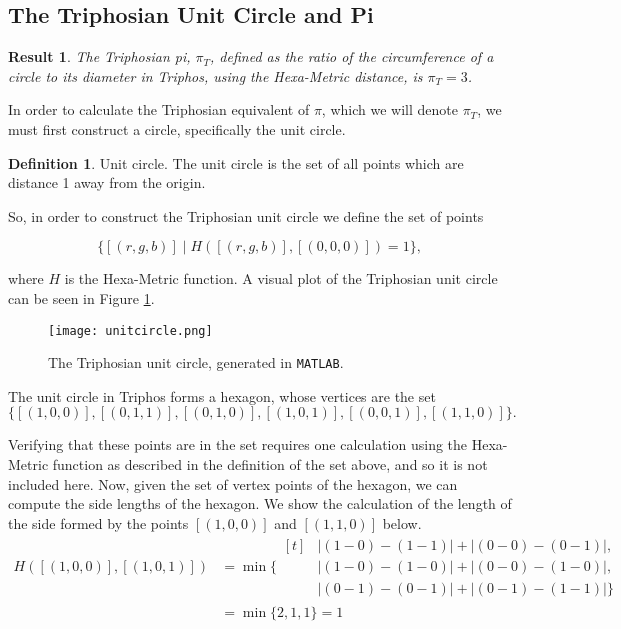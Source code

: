 \documentclass[11pt]{article}
\theoremstyle{definition}
\newtheorem{definition}{Definition}
\theoremstyle{plain}
\newtheorem{result}{Result}
\theoremstyle{remark}
\begin{document}
	\subsection{The Triphosian Unit Circle and Pi}

	\begin{result}
		The Triphosian pi, \(\pi_T\), defined as the ratio of the circumference
		of a circle to its diameter in Triphos, using the Hexa-Metric distance,
		is \(\pi_T = 3\).
	\end{result}

	In order to calculate the Triphosian equivalent of \(\pi\), which we will
	denote \(\pi_T\), we must first construct a circle, specifically the unit
	circle.

	\begin{definition}{Unit circle.}
		The unit circle is the set of all points which are distance 1 away from
		the origin.
	\end{definition}

	So, in order to construct the Triphosian unit circle we define the set of
	points

	\[\{[(r,g,b)] \mid H([(r,g,b)], [(0,0,0)]) = 1\},\]

	where \(H\) is the Hexa-Metric function. A visual plot of the Triphosian
	unit circle can be seen in Figure \ref{fig:uc}.

	\begin{figure}[htbp]
		\centering
		\texttt{[image: unitcircle.png]}
		\caption{The Triphosian unit circle, generated in \texttt{MATLAB}.}
		\label{fig:uc}
	\end{figure}

	The unit circle in Triphos forms a hexagon, whose vertices are the set
	\[ \{[(1,0,0)], [(0,1,1)], [(0,1,0)], [(1,0,1)], [(0,0,1)], [(1,1,0)]\}. \]

	Verifying that these points are in the set requires one calculation using
	the Hexa-Metric function as described in the definition of the set above,
	and so it is not included here. Now, given the set of vertex points of the
	hexagon, we can compute the side lengths of the hexagon. We show the
	calculation of the length of the side formed by the points \([(1,0,0)]\)
	and \([(1,1,0)]\) below.
	\begin{align*}
		H([(1,0,0)], [(1,0,1)])
		&= \min\{
		\begin{aligned}[t]
			&|(1 - 0) - (1 - 1)| + |(0 - 0) - (0 - 1)|, \\
			&|(1 - 0) - (1 - 0)| + |(0 - 0) - (1 - 0)|, \\
			&|(0 - 1) - (0 - 1)| + |(0 - 1) - (1 - 1)| \}
		\end{aligned}\\
		&= \min\{2,1,1\} = 1
	\end{align*}
\end{document}
